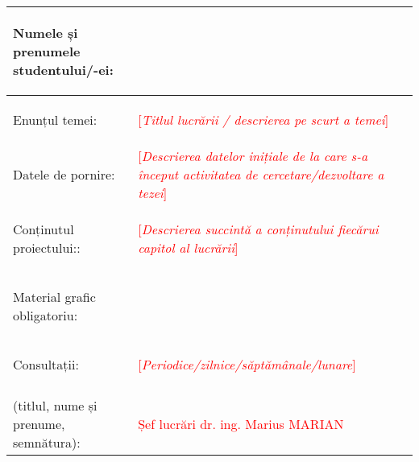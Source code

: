 \begin{center}
\begin{singlespace}
\renewcommand{\arraystretch}{2.5}
    \begin{tabular}{ |p{5.9cm}|p{10cm}| } 

    \hline\cellcolor[HTML]{f2f2f2}
    \begin{center}Numele și prenumele studentului/-ei:\end{center} &  \\ 
    \hline\cellcolor[HTML]{f2f2f2}
    \begin{center}Enunțul temei:\end{center} & \textcolor{red}{[\textit{Titlul lucrării / descrierea pe scurt a temei}]}  \\ 
    \hline\cellcolor[HTML]{f2f2f2}
    \begin{center}Datele de pornire:\end{center} & \textcolor{red}{[\textit{Descrierea datelor inițiale de la care s-a început activitatea de cercetare/dezvoltare a tezei}]} \\ 
    \hline\cellcolor[HTML]{f2f2f2}
    \begin{center}Conținutul proiectului::\end{center} & \textcolor{red}{[\textit{Descrierea succintă a conținutului fiecărui capitol al lucrării}]} \\
    \hline\cellcolor[HTML]{f2f2f2}
    \begin{center}Material grafic obligatoriu:\end{center} &  \\
    \hline\cellcolor[HTML]{f2f2f2}
    \begin{center}Consultații:\end{center} & \textcolor{red}{[\textit{Periodice/zilnice/săptămânale/lunare}]} \\
    \hline\cellcolor[HTML]{f2f2f2}
    \begin{center}Conducătorul științific\\
    (titlul, nume și prenume, semnătura):
    \end{center} & \textcolor{red}{Șef lucrări dr. ing. Marius MARIAN} \\
    \hline

    \end{tabular}
        
\newpage
\renewcommand{\arraystretch}{0.1}
    \begin{tabular}{ |p{5.9cm}|p{10cm}| }


\end{tabular}
\end{singlespace}
\end{center}
